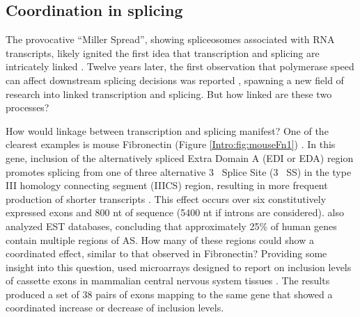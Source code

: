   \subsection{Coordination in splicing}\label{Intro:subsec:Coordination in splicing}

    The provocative ``Miller Spread'', showing spliceosomes associated with RNA transcripts, likely ignited the first idea that transcription and splicing are intricately linked \citep{Osheim1985}. Twelve years later, the first observation that polymerase speed can affect downstream splicing decisions was reported \citep{Cramer1997}, spawning a new field of research into linked transcription and splicing. But how linked are these two processes? 

    How would linkage between transcription and splicing manifest? One of the clearest examples is mouse Fibronectin \fn{} (Figure \ref{Intro:fig:mouseFn1}) \citep{Schwarzbauer1983, White2011a}. In this gene, inclusion of the alternatively spliced Extra Domain A (EDI or EDA) region promotes splicing from one of three alternative 3\textprime~ Splice Site (3\textprime~ SS) in the type III homology connecting segment (IIICS) region, resulting in more frequent production of shorter transcripts \citep{Fededa2005}. This effect occurs over six constitutively expressed exons and 800 nt of sequence (5400 nt if introns are considered). \citep{Fededa2005} also analyzed EST databases, concluding that approximately 25\% of human genes contain multiple regions of AS. How many of these regions could show a coordinated effect, similar to that observed in Fibronectin? Providing some insight into this question, \citep{Fagnani2007} used microarrays designed to report on inclusion levels of cassette exons in mammalian central nervous system tissues \citep{Fagnani2007}. The results produced a set of 38 pairs of exons mapping to the same gene that showed a coordinated increase or decrease of inclusion levels. 

